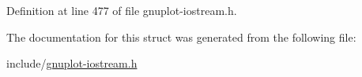Definition at line 477 of file gnuplot-\/iostream.\+h.



The documentation for this struct was generated from the following file\+:\begin{DoxyCompactItemize}
\item 
include/\hyperlink{gnuplot-iostream_8h}{gnuplot-\/iostream.\+h}\end{DoxyCompactItemize}
